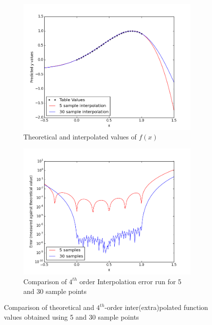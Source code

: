 \documentclass[paper=a4, fontsize=11pt]{scrartcl} %
\numberwithin{equation}{section} %
\numberwithin{figure}{section} %
\numberwithin{table}{section} %
\begin{document}
\begin{figure}
        \centering
        \begin{subfigure}{.5\textwidth}
  \centering
        \includegraphics[width=\linewidth]{q2/interpol.png}
                \caption{Theoretical and interpolated values of $f(x)$}
                \label{fig:q2_inter}
                \end{subfigure}%
\begin{subfigure}{.5\textwidth}
  \centering
        \includegraphics[width=\linewidth]{q2/error_log.png}
                \caption{Comparison of $4^{th}$ order Interpolation error run for 5 and 30 sample points}
                \label{fig:q2_error}
	\end{subfigure}
            
\caption{Comparison of theoretical and $4^{th}$-order inter(extra)polated function values obtained using 5 and 30 sample points}
\label{fig:q2}            
\end{figure}
\end{document}
